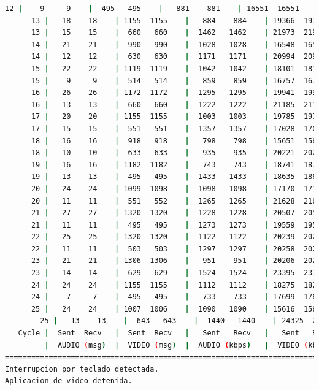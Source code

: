 \begin{lstlisting}[language=bash,basicstyle=\ttfamily\scriptsize]
      12 |    9     9    |  495   495    |   881    881    | 16551  16551    |  35     69       
      13 |   18    18    | 1155  1155    |   884    884    | 19366  19366    |  43     67       
      13 |   15    15    |  660   660    |  1462   1462    | 21973  21973    |  50     68       
      14 |   21    21    |  990   990    |  1028   1028    | 16548  16548    |  29     75       
      14 |   12    12    |  630   630    |  1171   1171    | 20994  20994    |  23     78       
      15 |   22    22    | 1119  1119    |  1042   1042    | 18101  18101    |  37     76       
      15 |    9     9    |  514   514    |   859    859    | 16757  16757    |  49     73       
      16 |   26    26    | 1172  1172    |  1295   1295    | 19941  19941    |  56     71       
      16 |   13    13    |  660   660    |  1222   1222    | 21185  21185    |  48     69       
      17 |   20    20    | 1155  1155    |  1003   1003    | 19785  19785    |  45     70       
      17 |   15    15    |  551   551    |  1357   1357    | 17028  17028    |  41     72       
      18 |   16    16    |  918   918    |   798    798    | 15651  15651    |  28     76       
      18 |   10    10    |  633   633    |   935    935    | 20221  20221    |  31     75       
      19 |   16    16    | 1182  1182    |   743    743    | 18741  18741    |  29     69       
      19 |   13    13    |  495   495    |  1433   1433    | 18635  18635    |  43     70       
      20 |   24    24    | 1099  1098    |  1098   1098    | 17170  17154    |  44     72       
      20 |   11    11    |  551   552    |  1265   1265    | 21628  21667    |  42     70       
      21 |   27    27    | 1320  1320    |  1228   1228    | 20507  20507    |  40     70       
      21 |   11    11    |  495   495    |  1273   1273    | 19559  19559    |  35     70       
      22 |   25    25    | 1320  1320    |  1122   1122    | 20239  20239    |  39     69       
      22 |   11    11    |  503   503    |  1297   1297    | 20258  20258    |  43     71       
      23 |   21    21    | 1306  1306    |   951    951    | 20206  20206    |  29     70       
      23 |   14    14    |  629   629    |  1524   1524    | 23395  23395    |  29     73       
      24 |   24    24    | 1155  1155    |  1112   1112    | 18275  18275    |  22     75       
      24 |    7     7    |  495   495    |   733    733    | 17699  17699    |  22     73       
      25 |   24    24    | 1007  1006    |  1090   1090    | 15616  15600    |  27     72       
        25 |   13    13    |  643   643    |  1440   1440    | 24325  24325    |  23     73       
   Cycle |  Sent  Recv   |  Sent  Recv   |   Sent   Recv   |   Sent   Recv   | Program System
         |  AUDIO (msg)  |  VIDEO (msg)  |  AUDIO (kbps)   |  VIDEO (kbps)   |     CPU (%) 
===========================================================================================
Interrupcion por teclado detectada.
Aplicacion de video detenida.


\end{lstlisting}
